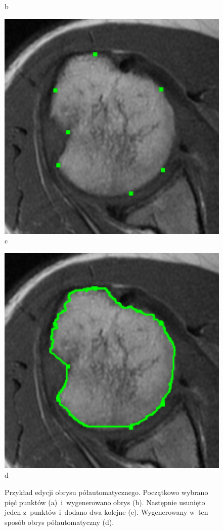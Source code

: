 \documentclass[a4paper,11pt,twoside,openright]{report}
\theoremstyle{definition}
\begin{document}
\begin{figure}[h!]
\begin{center}
\begin{center}
		b
	\end{center}
	\endminipage\hfill
	\begin{center}
		\includegraphics[width=1.0\textwidth]{148}
		c
	\end{center}
	\endminipage\hfill
	\begin{center}
		\includegraphics[width=1.0\textwidth]{149}
		d
	\end{center}
	\endminipage\hfill
	\caption{Przykład edycji obrysu półautomatycznego. Początkowo wybrano pięć punktów
	(a)~i~wygenerowano obrys (b). Następnie usunięto jeden z~punktów i~dodano dwa kolejne (c).
	Wygenerowany w~ten sposób obrys półautomatyczny (d).}
	\label{fig:146}
\end{center}
\end{figure}
\end{document}
